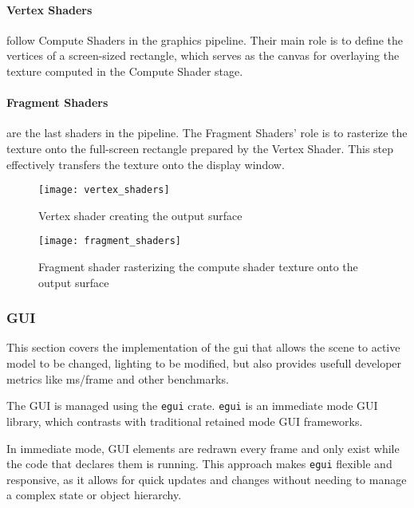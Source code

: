 \paragraph{Vertex Shaders} follow Compute Shaders in the graphics pipeline. Their main role is to define the vertices of a screen-sized rectangle, which serves as the canvas for overlaying the texture computed in the Compute Shader stage.
\paragraph{Fragment Shaders} are the last shaders in the pipeline. The Fragment Shaders' role is to rasterize the texture onto the full-screen rectangle prepared by the Vertex Shader. This step effectively transfers the texture onto the display window.
\begin{multicols}{2}
  \begin{figure}[H]
    \centering
    \texttt{[image: vertex\_shaders]}
    \caption{Vertex shader creating the output surface}
  \end{figure}

  \begin{figure}[H]
    \centering
    \texttt{[image: fragment\_shaders]}
    \caption{Fragment shader rasterizing the compute shader texture onto the output surface}
  \end{figure}
\end{multicols}

\subsubsection{GUI}

This section covers the implementation of the \acrshort{gui} that allows the scene to active model to be changed, lighting to be modified, but also provides usefull developer metrics like ms/frame and other benchmarks.

The GUI is managed using the \verb|egui| crate\supercite{egui:doc}.
\verb|egui| is an immediate\supercite{im_gui} mode GUI library, which contrasts with traditional retained mode GUI frameworks\supercite{im_vs_rt}.

In immediate mode, GUI elements are redrawn every frame and only exist while the code that declares them is running. This approach makes \verb|egui| flexible and responsive, as it allows for quick updates and changes without needing to manage a complex state or object hierarchy.

